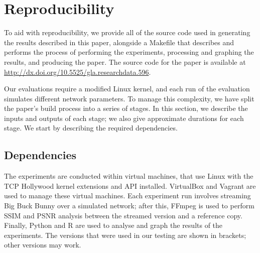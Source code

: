 \documentclass[sigconf]{acmart}
\begin{document}


\maketitle









\appendix

\section{Reproducibility}
\label{appendix:reproducibility}

To aid with reproducibility, we provide all of the source code used in generating the
results described in this paper, alongside a Makefile that describes and performs the
process of performing the experiments, processing and graphing the results, and producing
the paper. The source code for the paper is available at \url{http://dx.doi.org/10.5525/gla.researchdata.596}.

Our evaluations require a modified Linux kernel, and each run of the evaluation simulates
different network parameters. To manage this complexity, we have split the paper's build
process into a series of stages. In this section, we describe the inputs and outputs of
each stage; we also give approximate durations for each stage.
We start by describing the required dependencies.

\subsection*{Dependencies}

The experiments are conducted within virtual machines, that use Linux with the TCP
Hollywood kernel extensions and API installed. VirtualBox and Vagrant are used to manage
these virtual machines. Each experiment run involves streaming Big Buck Bunny over a 
simulated network; after this, FFmpeg is used to perform SSIM and PSNR analysis between
the streamed version and a reference copy. Finally, Python and R are used to analyse and
graph the results of the experiments. The versions that were used in our testing are shown
in brackets; other versions may work.
\end{document}
